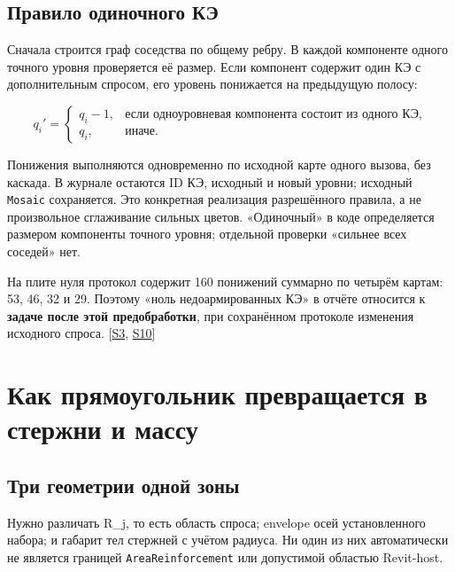 \documentclass[11pt,a4paper]{article}
\begin{document}
\subsection{Правило одиночного КЭ}

Сначала строится граф соседства по общему ребру. В каждой компоненте одного точного уровня проверяется её размер. Если компонент содержит один КЭ с дополнительным спросом, его уровень понижается на предыдущую полосу:


\[
q_i'=\begin{cases}
q_i-1,&\text{если одноуровневая компонента состоит из одного КЭ},\\
q_i,&\text{иначе}.
\end{cases}
\]

Понижения выполняются одновременно по исходной карте одного вызова, без каскада. В журнале остаются ID КЭ, исходный и новый уровни; исходный {\small\nolinkurl{Mosaic}} сохраняется. Это конкретная реализация разрешённого правила, а не произвольное сглаживание сильных цветов. «Одиночный» в коде определяется размером компоненты точного уровня; отдельной проверки «сильнее всех соседей» нет.


На плите нуля протокол содержит 160 понижений суммарно по четырём картам: 53, 46, 32 и 29. Поэтому «ноль недоармированных КЭ» в отчёте относится к \textbf{задаче после этой предобработки}, при сохранённом протоколе изменения исходного спроса. {\color{Teal}\small[\hyperlink{S3}{S3}, \hyperlink{S10}{S10}]}


\section{Как прямоугольник превращается в стержни и массу}

\subsection{Три геометрии одной зоны}

Нужно различать R\_j, то есть область спроса; envelope осей установленного набора; и габарит тел стержней с учётом радиуса. Ни один из них автоматически не является границей {\small\nolinkurl{AreaReinforcement}} или допустимой областью Revit-host.
\end{document}
